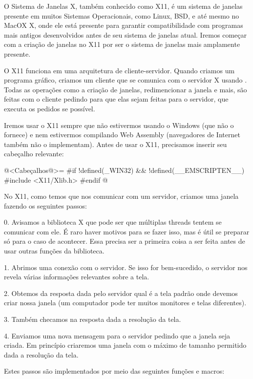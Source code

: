 

O Sistema de Janelas X, também conhecido como X11, é um sistema de
janelas presente em muitos Sistemas Operacionais, como Linux, BSD, e
até mesmo no MacOX X, onde ele está presente para garantir
compatibilidade com programas mais antigos desenvolvidos antes de seu
sistema de janelas atual. Iremos começar com a criação de janelas no
X11 por ser o sistema de janelas mais amplamente presente.

O X11 funciona em uma arquitetura de cliente-servidor. Quando criamos
um programa gráfico, criamos um cliente que se comunica com o servidor
X usando . Todas as operações como a criação de
janelas, redimencionar a janela e mais, são feitas com o cliente
pedindo para que elas sejam feitas para o servidor, que executa os
pedidos se possível.

Iremos usar o X11 sempre que não estivermos usando o Windows (que não
o fornece) e nem estivermos compilando Web Assembly (navegadores de
Internet também não o implementam). Antes de usar o X11, precisamos
inserir seu cabeçalho relevante:

\iniciocodigo
@<Cabeçalhos@>=
#if !defined(_WIN32) && !defined(__EMSCRIPTEN__)
#include <X11/Xlib.h>
#endif
@
\fimcodigo

No X11, como temos que nos comunicar com um servidor, criamos uma
janela fazendo os seguintes passos:

0. Avisamos a biblioteca X que pode ser que múltiplas threads tentem
se comunicar com ele. É raro haver motivos para se fazer isso, mas é
útil se preparar só para o caso de acontecer. Essa precisa ser a
primeira coisa a ser feita antes de usar outras funções da biblioteca.

1. Abrimos uma conexão com o servidor. Se isso for bem-sucedido, o
servidor nos revela várias informações relevantes sobre a tela.

2. Obtemos da resposta dada pelo servidor qual é a tela padrão onde
devemos criar nossa janela (um computador pode ter muitos monitores e
telas diferentes).

3. Também checamos na resposta dada a resolução da tela.

4. Enviamos uma nova mensagem para o servidor pedindo que a janela
seja criada. Em princípio criaremos uma janela com o máximo de tamanho
permitido dada a resolução da tela.

Estes passos são implementados por meio das seguintes funções e
macros:

